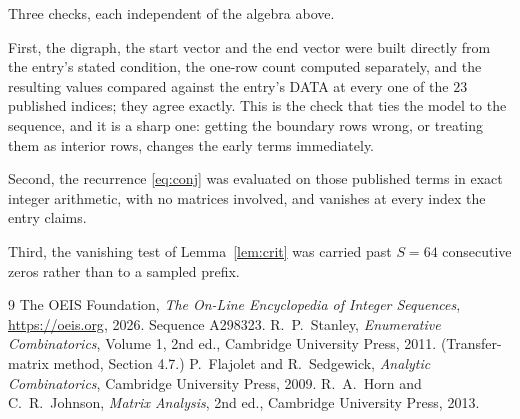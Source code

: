 \documentclass[11pt,a4paper]{article}
\theoremstyle{plain}
\theoremstyle{definition}
\begin{document}
Three checks, each independent of the algebra above.

First, the digraph, the start vector and the end vector were built directly from the
entry's stated condition, the one-row count computed separately, and the resulting values
compared against the entry's DATA at every one of the $23$ published indices; they
agree exactly. This is the check that ties the model to the sequence, and it is a sharp one:
getting the boundary rows wrong, or treating them as interior rows, changes the early terms
immediately.

Second, the recurrence \eqref{eq:conj} was evaluated on those published terms in exact
integer arithmetic, with no matrices involved, and vanishes at every index the entry claims.

Third, the vanishing test of Lemma~\ref{lem:crit} was carried past $S=64$ consecutive
zeros rather than to a sampled prefix.

\begin{thebibliography}{9}
 The OEIS Foundation, \emph{The On-Line Encyclopedia of Integer
Sequences}, \url{https://oeis.org}, 2026. Sequence A298323.
 R.~P.~Stanley, \emph{Enumerative Combinatorics}, Volume 1, 2nd ed.,
Cambridge University Press, 2011. (Transfer-matrix method, Section 4.7.)
 P.~Flajolet and R.~Sedgewick, \emph{Analytic Combinatorics}, Cambridge
University Press, 2009.
 R.~A.~Horn and C.~R.~Johnson, \emph{Matrix Analysis}, 2nd ed., Cambridge
University Press, 2013.
\end{thebibliography}
\end{document}
